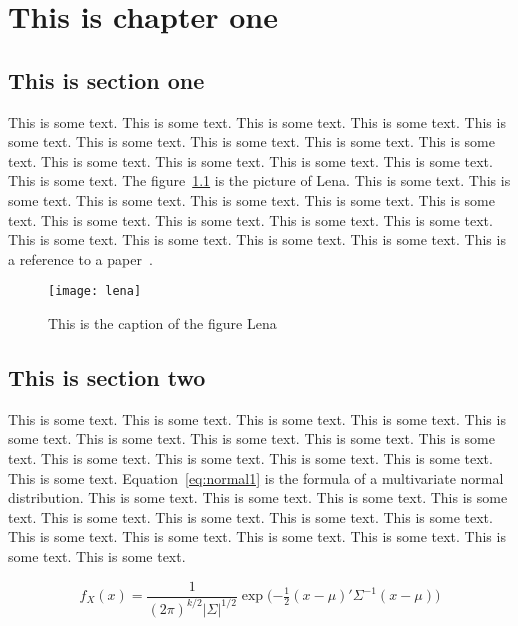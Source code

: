 \chapter{This is chapter one}


\section{This is section one}

This is some text. This is some text. This is some text. This is some text. This is some text. This is some text. This is some text. 
This is some text. This is some text. This is some text. This is some text. This is some text. This is some text. This is some text. 
The figure~\ref{fig:lena1} is the picture of Lena.
This is some text. This is some text. This is some text. This is some text. This is some text. This is some text. This is some text. 
This is some text. This is some text. This is some text. This is some text. This is some text. This is some text. This is some text. 
This is a reference to a paper~\cite{Garcia_2008_CVGPU}.

\begin{figure}[htbp]
    \centering
    \texttt{[image: lena]}
    \caption{This is the caption of the figure Lena}
    \label{fig:lena1}
\end{figure}


\section{This is section two}

This is some text. This is some text. This is some text. This is some text. This is some text. This is some text. This is some text. 
This is some text. This is some text. This is some text. This is some text. This is some text. This is some text. This is some text. 
Equation~\ref{eq:normal1} is the formula of a multivariate normal distribution.
This is some text. This is some text. This is some text. This is some text. This is some text. This is some text. This is some text. 
This is some text. This is some text. This is some text. This is some text. This is some text. This is some text. This is some text. 

\begin{equation}
    f_X(x) = \frac{1}{ (2\pi)^{k/2}|\Sigma|^{1/2} } \exp\!\Big( {-\tfrac{1}{2}}(x-\mu)'\Sigma^{-1}(x-\mu) \Big)
    \label{eq:normal1}
\end{equation}



